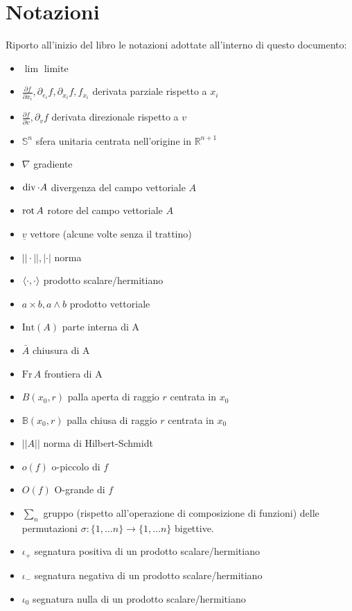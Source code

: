 \documentclass[12pt, twoside, italian, openany]{book}
\begin{document}
	\chapter*{Notazioni}
	Riporto all'inizio del libro le notazioni adottate all'interno di questo documento:
	\begin{itemize}[label=\hspace{-0.5em}]
		\item $\lim$ limite		
		\item $\frac{\partial f}{\partial x_i}, \partial_{e_i} f, \partial_{x_i} f, f_{x_i}$ derivata parziale rispetto a $x_i$
		\item $\frac{\partial f}{\partial v}, \partial_v f$ derivata direzionale rispetto a $v$
		\item $\mathbb{S}^{n}$ sfera unitaria centrata nell'origine in $\mathbb{R}^{n+1}$
		\item $\nabla$ gradiente
		\item $\operatorname{div} \cdot A$ divergenza del campo vettoriale $A$
		\item $\operatorname{rot} A$ rotore del campo vettoriale $A$
		\item $\underline{v}$ vettore (alcune volte senza il trattino)
		\item $||\cdot||, |\cdot|$ norma
		\item $\langle \cdot, \cdot \rangle$ prodotto scalare/hermitiano
		\item $a \times b, a \wedge b$ prodotto vettoriale
		\item $\text{Int}(A)$ parte interna di A
		\item $\bar{A}$ chiusura di A
		\item $\text{Fr} \, A$ frontiera di A
		\item $B(x_0, r)$ palla aperta di raggio $r$ centrata in $x_0$
		\item $\mathbb{B}(x_0, r)$ palla chiusa di raggio $r$ centrata in $x_0$
		\item $|| A ||$ norma di Hilbert-Schmidt
		\item $o(f)$ o-piccolo di $f$
		\item $O(f)$ O-grande di $f$
		\item $\sum_{n}$ gruppo (rispetto all'operazione di composizione di funzioni) delle permutazioni $\sigma: \{1, \ldots n \} \to \{1, \ldots n \}$ bigettive.
		\item $\iota_+$ segnatura positiva di un prodotto scalare/hermitiano
		\item $\iota_-$ segnatura negativa di un prodotto scalare/hermitiano
		\item $\iota_0$ segnatura nulla di un prodotto scalare/hermitiano

\end{itemize}
\end{document}
